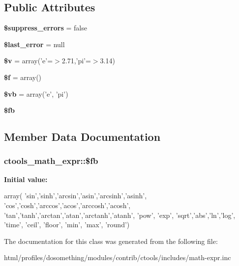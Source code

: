 \subsection*{Public Attributes}
\begin{DoxyCompactItemize}
\item 
\hypertarget{classctools__math__expr_ab806496312d3b16533be8124f78ff5f1}{
{\bfseries \$suppress\_\-errors} = false}
\label{classctools__math__expr_ab806496312d3b16533be8124f78ff5f1}

\item 
\hypertarget{classctools__math__expr_a33e0fd8d06e02200d1c9e6b24993f0fc}{
{\bfseries \$last\_\-error} = null}
\label{classctools__math__expr_a33e0fd8d06e02200d1c9e6b24993f0fc}

\item 
\hypertarget{classctools__math__expr_a94a23e0546305351c771627231f642c0}{
{\bfseries \$v} = array('e'=$>$2.71,'pi'=$>$3.14)}
\label{classctools__math__expr_a94a23e0546305351c771627231f642c0}

\item 
\hypertarget{classctools__math__expr_ac3cad0a5cd5fc08c7f7cc7355554e752}{
{\bfseries \$f} = array()}
\label{classctools__math__expr_ac3cad0a5cd5fc08c7f7cc7355554e752}

\item 
\hypertarget{classctools__math__expr_a0c0488ef7e2ea94730233f42c7e35480}{
{\bfseries \$vb} = array('e', 'pi')}
\label{classctools__math__expr_a0c0488ef7e2ea94730233f42c7e35480}

\item 
{\bfseries \$fb}
\end{DoxyCompactItemize}


\subsection{Member Data Documentation}
\hypertarget{classctools__math__expr_a46de081f47f9581b5e5272b12dc703b9}{
\subsubsection[{\$fb}]{\setlength{\rightskip}{0pt plus 5cm}ctools\_\-math\_\-expr::\$fb}}
\label{classctools__math__expr_a46de081f47f9581b5e5272b12dc703b9}
{\bfseries Initial value:}
\begin{DoxyCode}
 array(  
        'sin','sinh','arcsin','asin','arcsinh','asinh',
        'cos','cosh','arccos','acos','arccosh','acosh',
        'tan','tanh','arctan','atan','arctanh','atanh',
        'pow', 'exp',
        'sqrt','abs','ln','log',
        'time', 'ceil', 'floor', 'min', 'max', 'round')
\end{DoxyCode}


The documentation for this class was generated from the following file:\begin{DoxyCompactItemize}
\item 
html/profiles/dosomething/modules/contrib/ctools/includes/math-\/expr.inc\end{DoxyCompactItemize}
